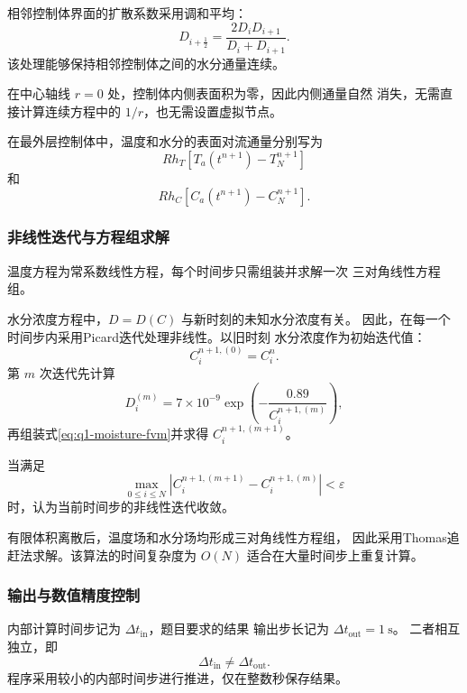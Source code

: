 \documentclass[12pt,a4paper]{article}
\begin{document}
\begin{center}
相邻控制体界面的扩散系数采用调和平均：
\begin{equation}
D_{i+\frac12}
=
\frac{2D_iD_{i+1}}{D_i+D_{i+1}}.
\label{eq:q1-harmonic}
\end{equation}
该处理能够保持相邻控制体之间的水分通量连续。

在中心轴线 $r=0$ 处，控制体内侧表面积为零，因此内侧通量自然
消失，无需直接计算连续方程中的 $1/r$，也无需设置虚拟节点。

在最外层控制体中，温度和水分的表面对流通量分别写为
\begin{equation}
Rh_T\left[T_a(t^{n+1})-T_N^{n+1}\right]
\end{equation}
和
\begin{equation}
Rh_C\left[C_a(t^{n+1})-C_N^{n+1}\right].
\end{equation}

\subsubsection{非线性迭代与方程组求解}

温度方程为常系数线性方程，每个时间步只需组装并求解一次
三对角线性方程组。

水分浓度方程中，$D=D(C)$ 与新时刻的未知水分浓度有关。
因此，在每一个时间步内采用Picard迭代处理非线性。以旧时刻
水分浓度作为初始迭代值：
\begin{equation}
C_i^{n+1,(0)}=C_i^n.
\end{equation}
第 $m$ 次迭代先计算
\begin{equation}
D_i^{(m)}
=
7\times10^{-9}
\exp\left(
-\frac{0.89}{C_i^{n+1,(m)}}
\right),
\end{equation}
再组装式\eqref{eq:q1-moisture-fvm}并求得
$C_i^{n+1,(m+1)}$。

当满足
\begin{equation}
\max_{0\le i\le N}
\left|
C_i^{n+1,(m+1)}
-
C_i^{n+1,(m)}
\right|
<\varepsilon
\label{eq:q1-picard-stop}
\end{equation}
时，认为当前时间步的非线性迭代收敛。

有限体积离散后，温度场和水分场均形成三对角线性方程组，
因此采用Thomas追赶法求解。该算法的时间复杂度为
$O(N)$
适合在大量时间步上重复计算。

\subsubsection{输出与数值精度控制}

内部计算时间步记为 $\Delta t_{\mathrm{in}}$，题目要求的结果
输出步长记为 $\Delta t_{\mathrm{out}}=1\ \mathrm{s}$。
二者相互独立，即
\begin{equation}
\Delta t_{\mathrm{in}}
\neq
\Delta t_{\mathrm{out}}.
\end{equation}
程序采用较小的内部时间步进行推进，仅在整数秒保存结果。


\end{center}
\end{document}

